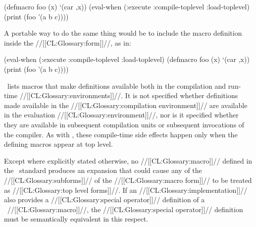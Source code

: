 \code
 (defmacro foo (x) `(car ,x))
 (eval-when (:execute :compile-toplevel :load-toplevel)
   (print (foo '(a b c))))
\endcode
    
A portable way to do the same thing would be to include the macro
definition inside the  //[[CL:Glossary:form]]//, as in:
    
\code
 (eval-when (:execute :compile-toplevel :load-toplevel)
   (defmacro foo (x) `(car ,x))
   (print (foo '(a b c))))
\endcode





\Thenextfigure\ lists macros that make definitions
available both in the compilation and run-time //[[CL:Glossary:environments]]//.
It is not specified whether definitions made available in the
//[[CL:Glossary:compilation environment]]// are available in the evaluation
//[[CL:Glossary:environment]]//, nor is it specified whether they are available
in subsequent compilation units or subsequent invocations of the
compiler.  As with , these compile-time side
effects happen only when the defining macros appear at 
top level.
 








\endsubsubsubsection%





Except where explicitly stated otherwise, no //[[CL:Glossary:macro]]// defined in
the \clisp\ standard produces an expansion that could cause any of the
//[[CL:Glossary:subforms]]// of the //[[CL:Glossary:macro form]]// to be treated as 
//[[CL:Glossary:top level forms]]//.  If an //[[CL:Glossary:implementation]]// also provides a
//[[CL:Glossary:special operator]]// definition of a \clisp\ //[[CL:Glossary:macro]]//, 
the //[[CL:Glossary:special operator]]// definition must be semantically equivalent
in this respect.

